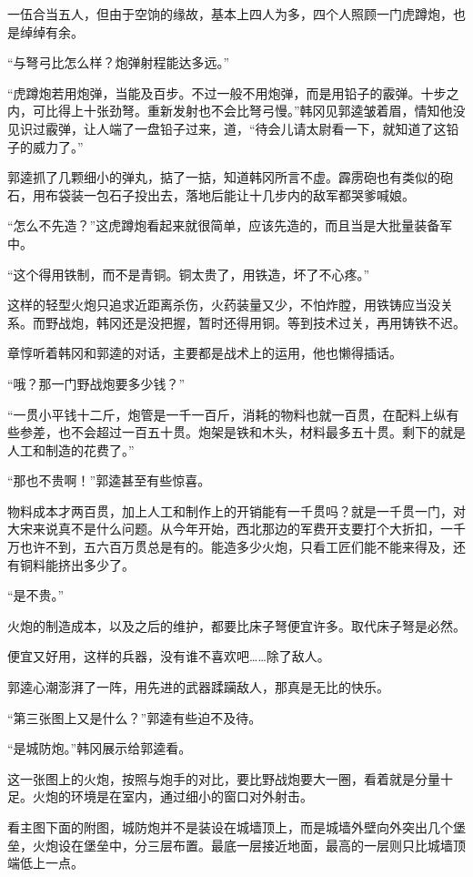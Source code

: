 一伍合当五人，但由于空饷的缘故，基本上四人为多，四个人照顾一门虎蹲炮，也是绰绰有余。

“与弩弓比怎么样？炮弹射程能达多远。”

“虎蹲炮若用炮弹，当能及百步。不过一般不用炮弹，而是用铅子的霰弹。十步之内，可比得上十张劲弩。重新发射也不会比弩弓慢。”韩冈见郭逵皱着眉，情知他没见识过霰弹，让人端了一盘铅子过来，道，“待会儿请太尉看一下，就知道了这铅子的威力了。”

郭逵抓了几颗细小的弹丸，掂了一掂，知道韩冈所言不虚。霹雳砲也有类似的砲石，用布袋装一包石子投出去，落地后能让十几步内的敌军都哭爹喊娘。

“怎么不先造？”这虎蹲炮看起来就很简单，应该先造的，而且当是大批量装备军中。

“这个得用铁制，而不是青铜。铜太贵了，用铁造，坏了不心疼。”

这样的轻型火炮只追求近距离杀伤，火药装量又少，不怕炸膛，用铁铸应当没关系。而野战炮，韩冈还是没把握，暂时还得用铜。等到技术过关，再用铸铁不迟。

章惇听着韩冈和郭逵的对话，主要都是战术上的运用，他也懒得插话。

“哦？那一门野战炮要多少钱？”

“一贯小平钱十二斤，炮管是一千一百斤，消耗的物料也就一百贯，在配料上纵有些参差，也不会超过一百五十贯。炮架是铁和木头，材料最多五十贯。剩下的就是人工和制造的花费了。”

“那也不贵啊！”郭逵甚至有些惊喜。

物料成本才两百贯，加上人工和制作上的开销能有一千贯吗？就是一千贯一门，对大宋来说真不是什么问题。从今年开始，西北那边的军费开支要打个大折扣，一千万也许不到，五六百万贯总是有的。能造多少火炮，只看工匠们能不能来得及，还有铜料能挤出多少了。

“是不贵。”

火炮的制造成本，以及之后的维护，都要比床子弩便宜许多。取代床子弩是必然。

便宜又好用，这样的兵器，没有谁不喜欢吧……除了敌人。

郭逵心潮澎湃了一阵，用先进的武器蹂躏敌人，那真是无比的快乐。

“第三张图上又是什么？”郭逵有些迫不及待。

“是城防炮。”韩冈展示给郭逵看。

这一张图上的火炮，按照与炮手的对比，要比野战炮要大一圈，看着就是分量十足。火炮的环境是在室内，通过细小的窗口对外射击。

看主图下面的附图，城防炮并不是装设在城墙顶上，而是城墙外壁向外突出几个堡垒，火炮设在堡垒中，分三层布置。最底一层接近地面，最高的一层则只比城墙顶端低上一点。


